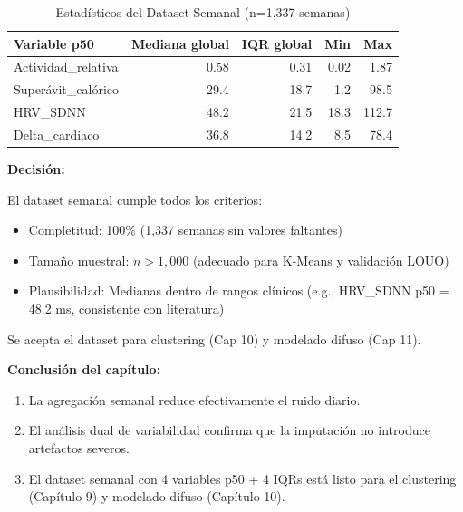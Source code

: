 \documentclass[12pt,letterpaper,twoside]{report}
\begin{document}
\begin{calculobox}
\begin{calculobox}
\begin{table}[H]
\centering
\begin{tabular}{@{}lrrrr@{}}
\toprule
\textbf{Variable p50} & \textbf{Mediana global} & \textbf{IQR global} & \textbf{Min} & \textbf{Max} \\
\midrule
Actividad\_relativa     & 0.58 & 0.31 & 0.02 & 1.87 \\
Superávit\_calórico     & 29.4 & 18.7 & 1.2  & 98.5 \\
HRV\_SDNN               & 48.2 & 21.5 & 18.3 & 112.7 \\
Delta\_cardiaco         & 36.8 & 14.2 & 8.5  & 78.4 \\
\bottomrule
\end{tabular}
\caption{Estadísticos del Dataset Semanal (n=1,337 semanas)}
\label{tab:weekly_stats}
\end{table}
\end{calculobox}

\begin{decisionbox}
\textbf{Decisión:}

El dataset semanal cumple todos los criterios:
\begin{itemize}[noitemsep]
    \item Completitud: 100\% (1,337 semanas sin valores faltantes)
    \item Tamaño muestral: $n > 1,000$ (adecuado para K-Means y validación LOUO)
    \item Plausibilidad: Medianas dentro de rangos clínicos (e.g., HRV\_SDNN p50 = 48.2 ms, consistente con literatura)
\end{itemize}

Se acepta el dataset para clustering (Cap 10) y modelado difuso (Cap 11).
\end{decisionbox}

\begin{conclusionbox}
\textbf{Conclusión del capítulo:}

\begin{enumerate}[noitemsep]
    \item La agregación semanal reduce efectivamente el ruido diario.
    \item El análisis dual de variabilidad confirma que la imputación no introduce artefactos severos.
    \item El dataset semanal con 4 variables p50 + 4 IQRs está listo para el clustering (Capítulo 9) y modelado difuso (Capítulo 10).
\end{enumerate}
\end{conclusionbox}


\end{calculobox}
\end{document}
